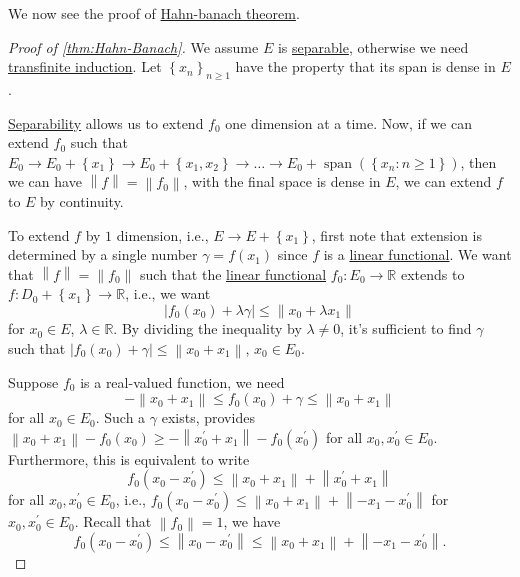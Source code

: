 We now see the proof of \hyperref[thm:Hahn-Banach]{Hahn-banach theorem}.

\begin{proof}[Proof of \autoref{thm:Hahn-Banach}]
	We assume \(E\) is \hyperref[def:separable]{separable}, otherwise we need \href{https://en.wikipedia.org/wiki/Transfinite_induction}{transfinite induction}. Let \(\left\{ x_{n} \right\}_{n \geq 1} \) have the property that its span is dense in \(E\).

	\begin{intuition}
		\hyperref[def:separable]{Separability} allows us to extend \(f_0\) one dimension at a time.  Now, if we can extend \(f_0\) such that \(E_0 \to E_0 + \left\{ x_1 \right\} \to E_0 + \left\{ x_1, x_2 \right\} \to \ldots \to E_0 + \mathop{\mathrm{span}}(\left\{ x_n\colon n \geq 1 \right\} ) \), then we can have \(\left\lVert f\right\rVert = \left\lVert f_0\right\rVert \), with the final space is dense in \(E\), we can extend \(f\) to \(E\) by continuity.
	\end{intuition}

	To extend \(f\) by \(1\) dimension, i.e., \(E \to E + \left\{ x_1 \right\} \), first note that extension is determined by a single number \(\gamma = f(x_1)\) since \(f\) is a \hyperref[def:linear-functional]{linear functional}. We want that \(\left\lVert f\right\rVert = \left\lVert f_0\right\rVert \) such that the \hyperref[def:linear-functional]{linear functional} \(f_0 \colon E_0 \to \mathbb{R} \) extends to \(f\colon D_0 + \left\{ x_1 \right\} \to \mathbb{R} \), i.e., we want
	\[
		\left\vert f_0 (x_0) + \lambda \gamma \right\vert \leq \left\lVert x_0 + \lambda  x_1\right\rVert
	\]
	for \(x_ 0 \in E\), \(\lambda \in \mathbb{R} \). By dividing the inequality by \(\lambda \neq 0\), it's sufficient to find \(\gamma \) such that \(\left\vert f_0(x_0) + \gamma  \right\vert \leq \left\lVert x_0 + x_1\right\rVert  \), \(x_0 \in E_0\).

	Suppose \(f_0\) is a real-valued function, we need
	\[
		- \left\lVert x_0 + x_1\right\rVert \leq f_0(x_0) + \gamma \leq \left\lVert x_0 + x_1\right\rVert
	\]
	for all \(x_0 \in E_0\). Such a \(\gamma \) exists, provides \(\left\lVert x_0 + x_1\right\rVert - f_0(x_0) \geq -\left\lVert x_0^\prime + x_1\right\rVert - f_0(x_0^\prime )\) for all \(x_0, x_0^\prime \in E_0\). Furthermore, this is equivalent to write
	\[
		f_0(x_0 - x_0^\prime ) \leq \left\lVert x_0 + x_1\right\rVert + \left\lVert x_0^\prime + x_1\right\rVert
	\]
	for all \(x_0, x_0^\prime \in E_0\), i.e., \(f_0(x_0 - x_0^\prime ) \leq \left\lVert x_0 + x_1\right\rVert + \left\lVert - x_1 - x_0^\prime \right\rVert \) for \(x_0, x_0^\prime \in E_0\). Recall that \(\left\lVert f_0\right\rVert = 1\), we have
	\[
		f_0(x_0 - x_0^\prime ) \leq \left\lVert x_0 - x_0^\prime \right\rVert \leq \left\lVert x_0 + x_1\right\rVert + \left\lVert -x_1 - x_0^\prime \right\rVert.
	\]


\end{proof}
